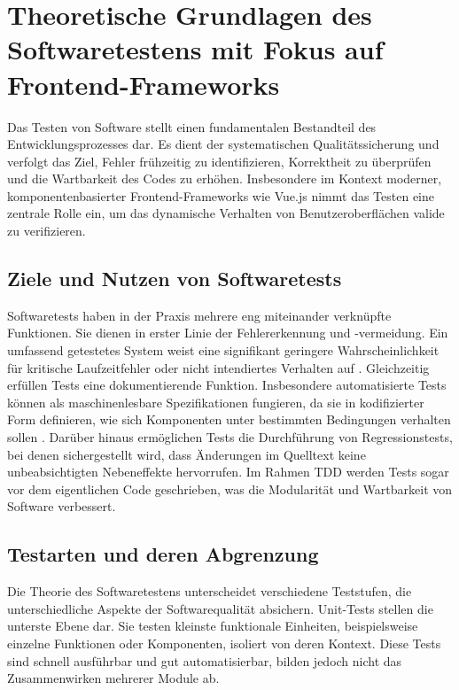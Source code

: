 \section{Theoretische Grundlagen des Softwaretestens mit Fokus auf Frontend-Frameworks}
\label{sec:testing-theorie}

Das Testen von Software stellt einen fundamentalen Bestandteil des Entwicklungsprozesses dar. Es dient der systematischen Qualitätssicherung und verfolgt das Ziel, Fehler frühzeitig zu identifizieren, Korrektheit zu überprüfen und die Wartbarkeit des Codes zu erhöhen. Insbesondere im Kontext moderner, komponentenbasierter Frontend-Frameworks wie Vue.js nimmt das Testen eine zentrale Rolle ein, um das dynamische Verhalten von Benutzeroberflächen valide zu verifizieren.

\subsection{Ziele und Nutzen von Softwaretests}

Softwaretests haben in der Praxis mehrere eng miteinander verknüpfte Funktionen. Sie dienen in erster Linie der Fehlererkennung und -vermeidung. Ein umfassend getestetes System weist eine signifikant geringere Wahrscheinlichkeit für kritische Laufzeitfehler oder nicht intendiertes Verhalten auf \cite{Myers2011}. Gleichzeitig erfüllen Tests eine dokumentierende Funktion. Insbesondere automatisierte Tests können als maschinenlesbare Spezifikationen fungieren, da sie in kodifizierter Form definieren, wie sich Komponenten unter bestimmten Bedingungen verhalten sollen \cite{Ammann2016}. Darüber hinaus ermöglichen Tests die Durchführung von Regressionstests, bei denen sichergestellt wird, dass Änderungen im Quelltext keine unbeabsichtigten Nebeneffekte hervorrufen. Im Rahmen \ac{TDD} werden Tests sogar vor dem eigentlichen Code geschrieben, was die Modularität und Wartbarkeit von Software verbessert.

\subsection{Testarten und deren Abgrenzung}

Die Theorie des Softwaretestens unterscheidet verschiedene Teststufen, die unterschiedliche Aspekte der Softwarequalität absichern. Unit-Tests stellen die unterste Ebene dar. Sie testen kleinste funktionale Einheiten, beispielsweise einzelne Funktionen oder Komponenten, isoliert von deren Kontext. Diese Tests sind schnell ausführbar und gut automatisierbar, bilden jedoch nicht das Zusammenwirken mehrerer Module ab.

